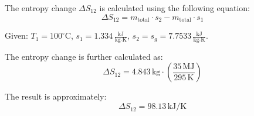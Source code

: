 The entropy change \( \Delta S_{12} \) is calculated using the following equation:  
\[
\Delta S_{12} = m_{\text{total}} \cdot s_2 - m_{\text{total}} \cdot s_1
\]  

Given:  
\( T_1 = 100^\circ\text{C} \),  
\( s_1 = 1.334 \, \frac{\text{kJ}}{\text{kg·K}} \),  
\( s_2 = s_g = 7.7533 \, \frac{\text{kJ}}{\text{kg·K}} \).  

The entropy change is further calculated as:  
\[
\Delta S_{12} = 4.843 \, \text{kg} \cdot \left( \frac{35 \, \text{MJ}}{295 \, \text{K}} \right)
\]  

The result is approximately:  
\[
\Delta S_{12} = 98.13 \, \text{kJ/K}
\]